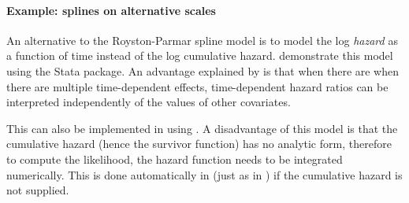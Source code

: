 \documentclass[nojss,nofooter]{jss}
\begin{document}
\paragraph{Example: splines on alternative scales}

An alternative to the Royston-Parmar spline model is to model the log
\emph{hazard} as a function of time instead of the log cumulative
hazard.  \citet{stgenreg} demonstrate this model using the Stata
 package.  An advantage explained by
\citet{royston:lambert:book} is that when there are when there are
multiple time-dependent effects, time-dependent hazard ratios can be
interpreted independently of the values of other covariates.

This can also be implemented in  using
.  A disadvantage of this model is that the
cumulative hazard (hence the survivor function) has no analytic form,
therefore to compute the likelihood, the hazard function needs to be
integrated numerically.  This is done automatically in
 (just as in ) if the cumulative
hazard is not supplied.
\end{document}
